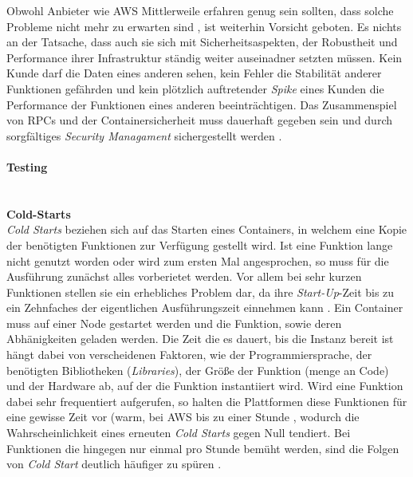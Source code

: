 \documentclass[11pt]{article}
\begin{document}
Obwohl Anbieter wie AWS Mittlerweile erfahren genug sein sollten, dass solche Probleme nicht mehr zu erwarten sind \cite{fowler2018serverless}, ist weiterhin Vorsicht geboten. Es nichts an der Tatsache, dass auch sie sich mit Sicherheitsaspekten, der Robustheit und Performance ihrer Infrastruktur ständig weiter auseinadner setzten müssen. Kein Kunde darf die Daten eines anderen sehen, kein Fehler die Stabilität anderer Funktionen gefährden und kein plötzlich auftretender \textit{Spike} eines Kunden die Performance der Funktionen eines anderen beeinträchtigen. Das Zusammenspiel von RPCs und der Containersicherheit muss dauerhaft gegeben sein und durch sorgfältiges \textit{Security Managament} sichergestellt werden \cite{mcgrath2017serverless}.  \\\\
\textbf{Testing}\\
\\\\
\textbf{Cold-Starts}\\
\textit{Cold Starts} beziehen sich auf das Starten eines Containers, in welchem eine Kopie der benötigten Funktionen zur Verfügung gestellt wird. Ist eine Funktion lange nicht genutzt worden oder wird zum ersten Mal angesprochen, so muss für die Ausführung zunächst alles vorberietet werden. Vor allem bei sehr kurzen Funktionen stellen sie ein erhebliches Problem dar, da ihre \textit{Start-Up}-Zeit bis zu ein Zehnfaches der eigentlichen Ausführungszeit einnehmen kann \cite{shahrad2019architectural}. Ein Container muss auf einer Node gestartet werden und die Funktion, sowie deren Abhänigkeiten geladen werden. Die Zeit die es dauert, bis die Instanz bereit ist hängt dabei von verscheidenen Faktoren, wie der Programmiersprache, der benötigten Bibliotheken (\textit{Libraries}), der Größe der Funktion (menge an Code) und der Hardware \cite{shafiei2020serverless} \cite{jonas2019cloud} ab, auf der die Funktion instantiiert wird. Wird eine Funktion dabei sehr frequentiert aufgerufen, so halten die Plattformen diese Funktionen für eine gewisse Zeit vor (\glqq warm\grqq{}, bei AWS bis zu einer Stunde \cite{roberts2017serverless}, wodurch die Wahrscheinlichkeit eines erneuten \textit{Cold Starts} gegen Null tendiert. Bei Funktionen die hingegen nur einmal pro Stunde bemüht werden, sind die Folgen von \textit{Cold Start} deutlich häufiger zu spüren \cite{roberts2017serverless}. \\\\
\end{document}
